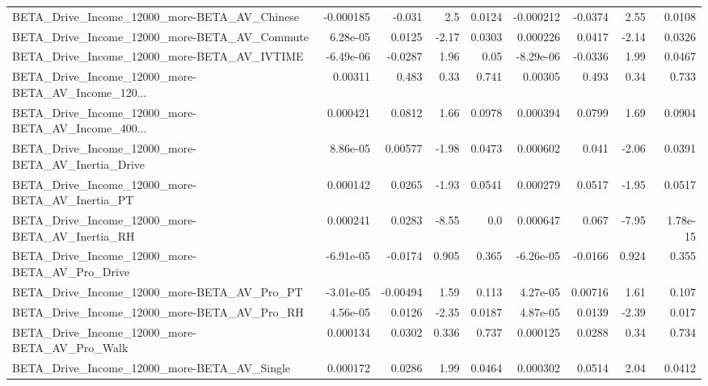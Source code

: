 \begin{tabular}{lrrrrrrrr}
BETA\_Drive\_Income\_12000\_more-BETA\_AV\_Chinese       &   -0.000185 &       -0.031 &      2.5 &   0.0124 &  -0.000212 &     -0.0374 &         2.55 &        0.0108 \\
BETA\_Drive\_Income\_12000\_more-BETA\_AV\_Commute       &    6.28e-05 &       0.0125 &    -2.17 &   0.0303 &   0.000226 &      0.0417 &        -2.14 &        0.0326 \\
BETA\_Drive\_Income\_12000\_more-BETA\_AV\_IVTIME        &   -6.49e-06 &      -0.0287 &     1.96 &     0.05 &  -8.29e-06 &     -0.0336 &         1.99 &        0.0467 \\
BETA\_Drive\_Income\_12000\_more-BETA\_AV\_Income\_120... &     0.00311 &        0.483 &     0.33 &    0.741 &    0.00305 &       0.493 &         0.34 &         0.733 \\
BETA\_Drive\_Income\_12000\_more-BETA\_AV\_Income\_400... &    0.000421 &       0.0812 &     1.66 &   0.0978 &   0.000394 &      0.0799 &         1.69 &        0.0904 \\
BETA\_Drive\_Income\_12000\_more-BETA\_AV\_Inertia\_Drive &    8.86e-05 &      0.00577 &    -1.98 &   0.0473 &   0.000602 &       0.041 &        -2.06 &        0.0391 \\
BETA\_Drive\_Income\_12000\_more-BETA\_AV\_Inertia\_PT    &    0.000142 &       0.0265 &    -1.93 &   0.0541 &   0.000279 &      0.0517 &        -1.95 &        0.0517 \\
BETA\_Drive\_Income\_12000\_more-BETA\_AV\_Inertia\_RH    &    0.000241 &       0.0283 &    -8.55 &      0.0 &   0.000647 &       0.067 &        -7.95 &      1.78e-15 \\
BETA\_Drive\_Income\_12000\_more-BETA\_AV\_Pro\_Drive     &   -6.91e-05 &      -0.0174 &    0.905 &    0.365 &  -6.26e-05 &     -0.0166 &        0.924 &         0.355 \\
BETA\_Drive\_Income\_12000\_more-BETA\_AV\_Pro\_PT        &   -3.01e-05 &     -0.00494 &     1.59 &    0.113 &   4.27e-05 &     0.00716 &         1.61 &         0.107 \\
BETA\_Drive\_Income\_12000\_more-BETA\_AV\_Pro\_RH        &    4.56e-05 &       0.0126 &    -2.35 &   0.0187 &   4.87e-05 &      0.0139 &        -2.39 &         0.017 \\
BETA\_Drive\_Income\_12000\_more-BETA\_AV\_Pro\_Walk      &    0.000134 &       0.0302 &    0.336 &    0.737 &   0.000125 &      0.0288 &         0.34 &         0.734 \\
BETA\_Drive\_Income\_12000\_more-BETA\_AV\_Single        &    0.000172 &       0.0286 &     1.99 &   0.0464 &   0.000302 &      0.0514 &         2.04 &        0.0412 \\

\end{tabular}
